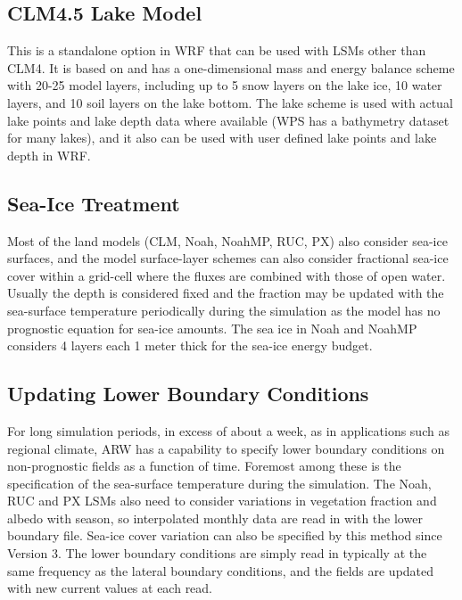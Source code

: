 \subsection{CLM4.5 Lake Model}

This is a standalone option in WRF that can be used with LSMs other than CLM4. It is based on \citet{subin12} and has a 
one-dimensional mass and energy balance scheme with 20-25 model layers,
including up to 5 snow layers on the lake ice, 10 water layers, and 10 soil
layers on the lake bottom. The lake scheme is used with actual lake points and
lake depth data where available (WPS has a bathymetry dataset for many lakes), and it also can be used with user defined
lake points and lake depth in WRF.

\subsection{Sea-Ice Treatment}

Most of the land models (CLM, Noah, NoahMP, RUC, PX) also consider sea-ice surfaces, and the model surface-layer schemes
can also consider fractional sea-ice cover within a grid-cell where the fluxes are combined with those of open water.
Usually the depth is considered fixed and the fraction may be updated with the sea-surface temperature periodically
during the simulation as the model has no prognostic equation for sea-ice amounts.
The sea ice in Noah and NoahMP considers 4 layers each 1 meter thick for the sea-ice energy budget.

\subsection{Updating Lower Boundary Conditions}

For long simulation periods, in excess of about a week, as in applications such as 
regional climate, ARW has a capability to specify lower boundary conditions 
on non-prognostic fields as
a function of time. Foremost among these is the specification of the 
sea-surface temperature during the simulation. The Noah, RUC and PX LSMs also
need to consider variations in vegetation fraction and albedo with season, so
interpolated monthly data are read in with the lower boundary file.
Sea-ice cover variation can also be specified by this method since Version 3.
The lower boundary conditions are simply read in typically at the
same frequency as the lateral boundary conditions, and the fields are
updated with new current values at each read.

